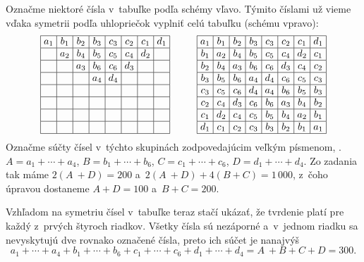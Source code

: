 {\ineriesenie
Označme niektoré čísla v~tabuľke podľa schémy vľavo.
Týmito číslami už vieme vďaka symetrii podľa uhlopriečok vyplniť
celú tabuľku (schému vpravo):
$$
\centerline{\offinterlineskip \everycr{\noalign{\hrule}}\let\\=\cr
\dimen1=1.6em
\vbox{\halign{\strut\vrule#&&\hbox to\dimen1{\hss#\unskip\hss}\vrule\cr
&$ a_1 $ & $ b_1 $ & $ b_2 $ & $ b_3 $ & $ c_3 $ & $ c_2 $ & $ c_1 $ & $ d_1 $ \\
& & $ a_2 $ & $ b_4 $ & $ b_5 $ & $ c_5 $ & $ c_4 $ & $ d_2 $ & \\
& && $ a_3 $ & $ b_6 $ & $ c_6 $ & $ d_3 $ && \\
& &&& $ a_4 $ & $ d_4 $ &&& \\
&&&&&&&& \\
&&&&&&&& \\
&&&&&&&& \\
&&&&&&&& \\
}}\hfil
\vbox{\halign{\strut\vrule#&&\hbox to\dimen1{\hss#\unskip\hss}\vrule\cr
&$ a_1 $ & $ b_1 $ & $ b_2 $ & $ b_3 $ & $ c_3 $ & $ c_2 $ & $ c_1 $ & $ d_1 $ \\
&$ b_1 $ & $ a_2 $ & $ b_4 $ & $ b_5 $ & $ c_5 $ & $ c_4 $ & $ d_2 $ & $ c_1 $ \\
&$ b_2 $ & $ b_4 $ & $ a_3 $ & $ b_6 $ & $ c_6 $ & $ d_3 $ & $ c_4 $ & $ c_2 $ \\
&$ b_3 $ & $ b_5 $ & $ b_6 $ & $ a_4 $ & $ d_4 $ & $ c_6 $ & $ c_5 $ & $ c_3 $ \\
&$ c_3 $ & $ c_5 $ & $ c_6 $ & $ d_4 $ & $ a_4 $ & $ b_6 $ & $ b_5 $ & $ b_3 $ \\
&$ c_2 $ & $ c_4 $ & $ d_3 $ & $ c_6 $ & $ b_6 $ & $ a_3 $ & $ b_4 $ & $ b_2 $ \\
&$ c_1 $ & $ d_2 $ & $ c_4 $ & $ c_5 $ & $ b_5 $ & $ b_4 $ & $ a_2 $ & $ b_1 $ \\
&$ d_1 $ & $ c_1 $ & $ c_2 $ & $ c_3 $ & $ b_3 $ & $ b_2 $ & $ b_1 $ & $ a_1 $ \\
}}}
$$
Označme súčty čísel v~týchto skupinách zodpovedajúcim veľkým
písmenom, \tj. $A = a_1 + \cdots + a_4$, $B = b_1 + \cdots + b_6$,
$C = c_1 + \cdots + c_6$, $D = d_1 + \cdots + d_4$. Zo zadania tak máme
$2 (A~+ D) = 200$ a~$2 (A~+ D) +4 (B + C) = 1\,000$, z~čoho úpravou dostaneme $A + D = 100$
a~$B + C = 200$.

Vzhľadom na symetriu čísel v~tabuľke teraz stačí ukázať, že tvrdenie platí pre
každý z~prvých štyroch riadkov. Všetky čísla sú nezáporné
a~v~jednom riadku sa nevyskytujú dve rovnako označené čísla, preto ich
súčet je nanajvýš
$$
a_1 + \cdots + a_4 + b_1 + \cdots + b_6 + c_1 + \cdots + c_6 + d_1 + \cdots + d_4 = A~+ B + C + D = 300.
$$

}
